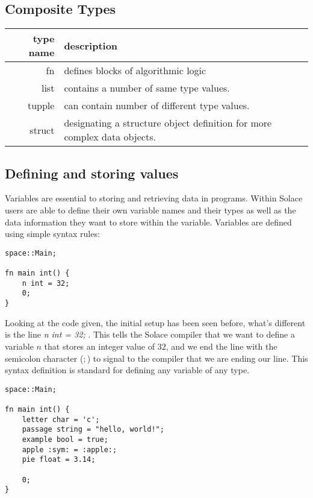 \documentclass{article}
\begin{document}
\subsection{Composite Types}
\begin{center}
\begin{tabular}{|r|l|}
	\hline
	type name & description \\
	\hline
	\hline
	fn & defines blocks of algorithmic logic \\
	list & contains a number of same type values. \\
	tupple & can contain number of different type values. \\
	struct & designating a structure object definition for more complex data objects. \\
	\hline
\end{tabular}
\end{center}

\subsection{Defining and storing values}

Variables are essential to storing and retrieving data in programs. Within Solace users are able to define their own variable names and their types
as well as the data information they want to store within the variable. Variables are defined using simple syntax rules:

\begin{lstlisting}
space::Main;

fn main int() {
	n int = 32;
 	0;
}
\end{lstlisting}

Looking at the code given, the initial setup has been seen before, what's different is the line \textit{n int = 32;} . This tells the Solace compiler that we want
to define a variable $n$ that stores an integer value of $32$, and we end the line with the semicolon character ($;$) to signal to the compiler that we are ending our
line. This syntax definition is standard for defining any variable of any type.

\begin{lstlisting}
space::Main;

fn main int() {
	letter char = 'c';
	passage string = "hello, world!";
 	example bool = true;
  	apple :sym: = :apple:;
   	pie float = 3.14;

 	0;
}
\end{lstlisting}
\end{document}
